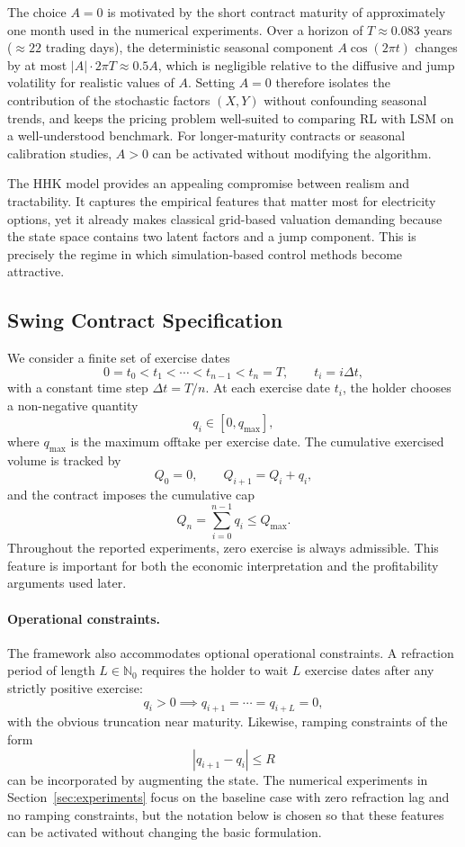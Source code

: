 \documentclass[a4paper,fleqn]{cas-dc}
\begin{document}
The choice $A = 0$ is motivated by the short contract maturity of approximately one month used in the numerical experiments.
Over a horizon of $T \approx 0.083$ years ($\approx 22$ trading days), the deterministic seasonal component $A\cos(2\pi t)$ changes by at most $|A|\cdot 2\pi T \approx 0.5A$, which is negligible relative to the diffusive and jump volatility for realistic values of $A$.
Setting $A = 0$ therefore isolates the contribution of the stochastic factors $(X,Y)$ without confounding seasonal trends, and keeps the pricing problem well-suited to comparing RL with LSM on a well-understood benchmark.
For longer-maturity contracts or seasonal calibration studies, $A > 0$ can be activated without modifying the algorithm.

The HHK model provides an appealing compromise between realism and tractability. It captures the empirical features that matter most for electricity options, yet it already makes classical grid-based valuation demanding because the state space contains two latent factors and a jump component. This is precisely the regime in which simulation-based control methods become attractive.

\subsection{Swing Contract Specification}

We consider a finite set of exercise dates
\[
0 = t_0 < t_1 < \cdots < t_{n-1} < t_n = T,
\qquad
t_i = i \Delta t,
\]
with a constant time step $\Delta t = T/n$. At each exercise date $t_i$, the holder chooses a non-negative quantity
\[
q_i \in [0,q_{\max}],
\]
where $q_{\max}$ is the maximum offtake per exercise date. The cumulative exercised volume is tracked by
\[
Q_0 = 0,
\qquad
Q_{i+1} = Q_i + q_i,
\]
and the contract imposes the cumulative cap
\[
Q_n = \sum_{i=0}^{n-1} q_i \le Q_{\max}.
\]
Throughout the reported experiments, zero exercise is always admissible. This feature is important for both the economic interpretation and the profitability arguments used later.

\paragraph{Operational constraints.}
The framework also accommodates optional operational constraints. A refraction period of length $L \in \mathbb{N}_0$ requires the holder to wait $L$ exercise dates after any strictly positive exercise:
\[
q_i > 0 \implies q_{i+1} = \cdots = q_{i+L} = 0,
\]
with the obvious truncation near maturity. Likewise, ramping constraints of the form
\[
|q_{i+1} - q_i| \le R
\]
can be incorporated by augmenting the state. The numerical experiments in Section~\ref{sec:experiments} focus on the baseline case with zero refraction lag and no ramping constraints, but the notation below is chosen so that these features can be activated without changing the basic formulation.
\end{document}
